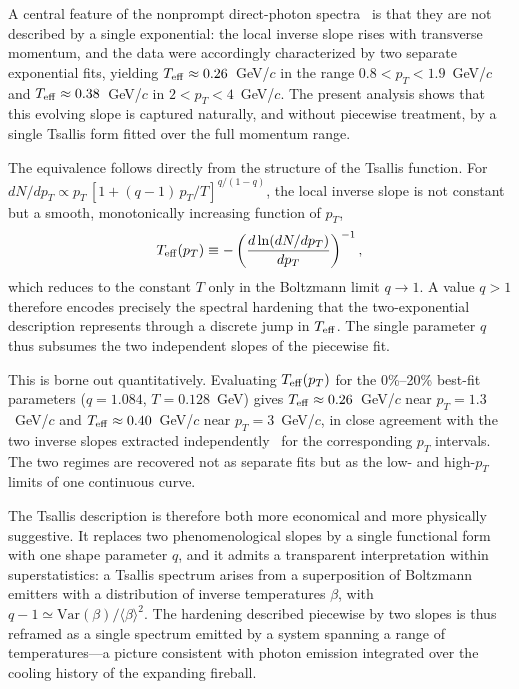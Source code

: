 \documentclass[onecolumn]{revtex4}
\begin{document}

A central feature of the nonprompt direct-photon spectra~\cite{PHENIX2024} 
is that they are not described by a single
exponential: the local inverse slope rises with transverse momentum, and
the data were accordingly characterized by two separate exponential fits,
yielding $T_{\rm eff} \approx 0.26$~GeV/$c$ in the range $0.8 < p_T < 1.9$~GeV/$c$
and $T_{\rm eff} \approx 0.38$~GeV/$c$ in $2 < p_T < 4$~GeV/$c$. The present
analysis shows that this evolving slope is captured naturally, and without
piecewise treatment, by a single Tsallis form fitted over
the full momentum range.

The equivalence follows directly from the structure of the Tsallis
function. For $dN/dp_T \propto p_T\,[1+(q-1)\,p_T/T]^{q/(1-q)}$, the local
inverse slope is not constant but a smooth, monotonically increasing
function of $p_T$,
\begin{equation}
    T_{\rm eff}(p_T) \equiv
    -\left(\frac{d\ln(dN/dp_T)}{dp_T}\right)^{-1},
\end{equation}
which reduces to the constant $T$ only in the Boltzmann limit $q\to 1$. A
value $q>1$ therefore encodes precisely the spectral hardening that the
two-exponential description represents through a discrete jump in
$T_{\rm eff}$. The single parameter $q$ thus subsumes the two independent
slopes of the piecewise fit. %

This is borne out quantitatively. Evaluating $T_{\rm eff}(p_T)$ for the
0\%--20\% best-fit parameters ($q = 1.084$, $T = 0.128$~GeV) gives
$T_{\rm eff} \approx 0.26$~GeV/$c$ near $p_T = 1.3$~GeV/$c$ and
$T_{\rm eff} \approx 0.40$~GeV/$c$ near $p_T = 3$~GeV/$c$, in close
agreement with the two inverse slopes extracted independently~\cite{PHENIX2024} for the corresponding $p_T$ intervals. The two
regimes are recovered not as separate fits but as the low- and high-$p_T$
limits of one continuous curve.

The Tsallis description is therefore both more economical and more
physically suggestive. It replaces two phenomenological slopes by a single
functional form with one shape parameter $q$, and it admits a transparent
interpretation within superstatistics: a Tsallis spectrum arises from a
superposition of Boltzmann emitters with a distribution of inverse
temperatures $\beta$, with $q-1 \simeq \mathrm{Var}(\beta)/\langle\beta\rangle^2$.
The hardening described piecewise by two slopes is thus reframed as a
single spectrum emitted by a system spanning a range of temperatures---a
picture consistent with photon emission integrated over the cooling history
of the expanding fireball.
\end{document}
